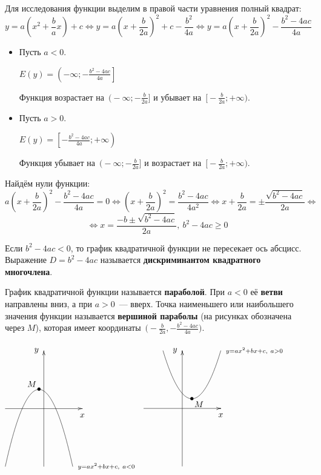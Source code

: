 Для исследования функции выделим в правой части уравнения полный квадрат:
\begin{equation*}
y = a \left( x^2 + \frac{b}a x \right) + c \Leftrightarrow
y = a \left( x + \frac{b}{2a} \right)^2 + c - \frac{b^2}{4a} \Leftrightarrow
y = a \left( x + \frac{b}{2a} \right)^2 - \frac{b^2 - 4ac}{4a}
\end{equation*}
\begin{itemize}
	\item Пусть $a < 0$.
	
	$\displaystyle E(y) = \left( -\infty; -\frac{b^2 - 4ac}{4a} \right]$
	
	Функция возрастает на~$\bigl( -\infty; -\frac{b}{2a} \bigr]$ и убывает на~$\bigl[ -\frac{b}{2a}; +\infty \bigr)$.
	
	\item Пусть $a > 0$.
	
	$\displaystyle E(y) = \left[ -\frac{b^2 - 4ac}{4a}; +\infty \right)$
	
	Функция убывает на~$\bigl( -\infty; -\frac{b}{2a} \bigr]$ и возрастает на~$\bigl[ -\frac{b}{2a}; +\infty \bigr)$.
\end{itemize}

Найдём нули функции:
\begin{equation*}
a \left( x + \frac{b}{2a} \right)^2 - \frac{b^2 - 4ac}{4a} = 0 \Leftrightarrow
\left( x + \frac{b}{2a} \right)^2 = \frac{b^2 - 4ac}{4a^2} \Leftrightarrow
x + \frac{b}{2a} = \pm\frac{\sqrt{b^2 - 4ac}}{2a} \Leftrightarrow
\end{equation*}
\begin{equation*}
\Leftrightarrow x = \frac{-b \pm \sqrt{b^2 - 4ac}}{2a}, \ b^2 - 4ac \geqslant 0
\end{equation*}

Если $b^2 - 4ac < 0$, то график квадратичной функции не пересекает ось абсцисс.
 Выражение $D = b^2 - 4ac$ называется \textbf{дискриминантом квадратного многочлена}.

 График квадратичной функции называется \textbf{параболой}.
При $a < 0$ её \textbf{ветви} направлены вниз, а при $a > 0$~--- вверх.
Точка наименьшего или наибольшего значения функции называется \textbf{вершиной параболы} (на рисунках обозначена через $M$), которая имеет координаты~$\bigl( -\frac{b}{2a}, -\frac{b^2 - 4ac}{4a} \bigr)$.
\begin{center}
$\begin{xy} /r8mm/:
(-2, 0); (2, 0) **@{-} *@{>} *++!U{x};
(0, -3); (0, 3) **@{-} *@{>} *++!R{y};
(-2, -3); (1.5, -3) **\crv{(-0.25, 5)} *++!L{\scriptstyle y = ax^2 + bx + c, \ a < 0};
(-0.25, 1) *{\bullet} *+!DR{M};
\end{xy}$
$\begin{xy} /r8mm/:
(-2, 0); (2, 0) **@{-} *@{>} *++!U{x};
(0, -3); (0, 3) **@{-} *@{>} *++!R{y};
(-1, 3); (2, 3) **\crv{(0.5, -2)} *++!L{\scriptstyle y = ax^2 + bx + c, \ a > 0};
(0.5, 0.5) *{\bullet} *+!UL{M};
\end{xy}$
\end{center}

